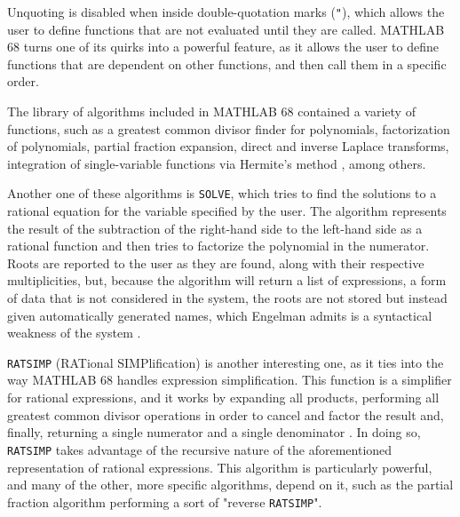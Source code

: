 Unquoting is disabled when inside double-quotation marks (\verb|"|), which allows the user to define functions that are not evaluated until they are called. MATHLAB 68 turns one of its quirks into a powerful feature, as it allows the user to define functions that are dependent on other functions, and then call them in a specific order.

The library of algorithms included in MATHLAB 68 contained a variety of functions, such as a greatest common divisor finder for polynomials, factorization of polynomials,  partial fraction expansion, direct and inverse Laplace transforms, integration of single-variable functions via Hermite's method \parencite{hardy1916integration}, among others.

Another one of these algorithms is \verb|SOLVE|, which tries to find the solutions to a rational equation for the variable specified by the user. The algorithm represents the result of the subtraction of the right-hand side to the left-hand side as a rational function and then tries to factorize the polynomial in the numerator. Roots are reported to the user as they are found, along with their respective multiplicities, but, because the algorithm will return a list of expressions, a form of data that is not considered in the system, the roots are not stored but instead given automatically generated names, which Engelman admits is a syntactical weakness of the system \parencite{engelman1971legacy}.

\verb|RATSIMP| (RATional SIMPlification) is another interesting one, as it ties into the way MATHLAB 68 handles expression simplification. This function is a simplifier for rational expressions, and it works by expanding all products, performing all greatest common divisor operations in order to cancel and factor the result and, finally, returning a single numerator and a single denominator \parencite{engelman1971legacy}. In doing so, \verb|RATSIMP| takes advantage of the recursive nature of the aforementioned representation of rational expressions. This algorithm is particularly powerful, and many of the other, more specific algorithms, depend on it, such as the partial fraction algorithm performing a sort of "reverse \verb|RATSIMP|".

